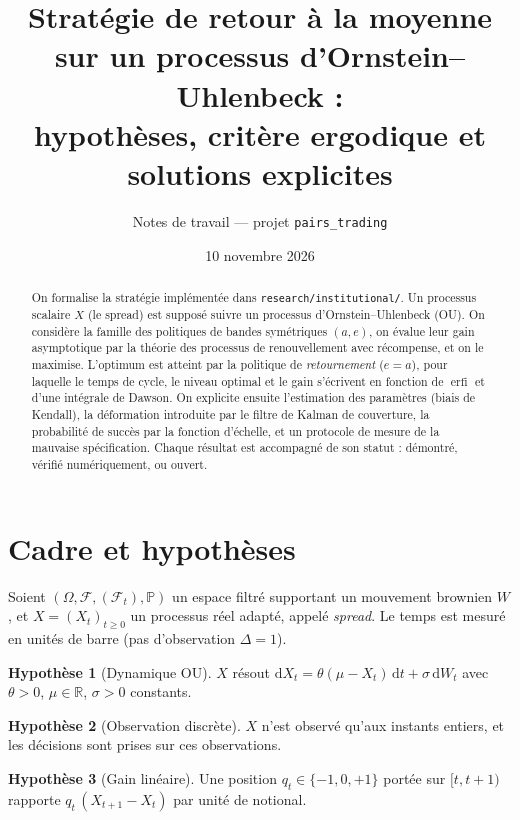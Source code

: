 \documentclass[11pt,a4paper]{article}
\title{Stratégie de retour à la moyenne sur un processus d'Ornstein--Uhlenbeck :\\
hypothèses, critère ergodique et solutions explicites}
\author{Notes de travail --- projet \texttt{pairs\_trading}}
\date{10 novembre 2026}
\theoremstyle{definition}
\newtheorem{hyp}{Hypothèse}
\theoremstyle{remark}
\renewcommand{\P}{\mathbb{P}}
\newcommand{\R}{\mathbb{R}}
\newcommand{\dd}{\mathrm{d}}
\DeclareMathOperator{\erfi}{erfi}
\begin{document}
\maketitle

\begin{abstract}
On formalise la stratégie implémentée dans \texttt{research/institutional/}. Un processus scalaire $X$ (le spread)
est supposé suivre un processus d'Ornstein--Uhlenbeck (OU). On considère la famille des politiques de bandes
symétriques $(a,e)$, on évalue leur gain asymptotique par la théorie des processus de renouvellement avec
récompense, et on le maximise. L'optimum est atteint par la politique de \emph{retournement} ($e=a$), pour laquelle
le temps de cycle, le niveau optimal et le gain s'écrivent en fonction de $\erfi$ et d'une intégrale de Dawson.
On explicite ensuite l'estimation des paramètres (biais de Kendall), la déformation introduite par le filtre de
Kalman de couverture, la probabilité de succès par la fonction d'échelle, et un protocole de mesure de la
mauvaise spécification. Chaque résultat est accompagné de son statut : démontré, vérifié numériquement, ou ouvert.
\end{abstract}

\tableofcontents

\section{Cadre et hypothèses}

Soient $(\Omega,\mathcal F,(\mathcal F_t),\P)$ un espace filtré supportant un mouvement brownien $W$, et
$X=(X_t)_{t\ge 0}$ un processus réel adapté, appelé \emph{spread}. Le temps est mesuré en unités de barre
(pas d'observation $\Delta=1$).

\begin{hyp}[Dynamique OU]\label{h:ou}
$X$ résout $\dd X_t=\theta(\mu-X_t)\,\dd t+\sigma\,\dd W_t$ avec $\theta>0$, $\mu\in\R$, $\sigma>0$ constants.
\end{hyp}

\begin{hyp}[Observation discrète]\label{h:disc}
$X$ n'est observé qu'aux instants entiers, et les décisions sont prises sur ces observations.
\end{hyp}

\begin{hyp}[Gain linéaire]\label{h:pnl}
Une position $q_t\in\{-1,0,+1\}$ portée sur $[t,t+1)$ rapporte $q_t\,(X_{t+1}-X_t)$ par unité de notional.
\end{hyp}
\end{document}
